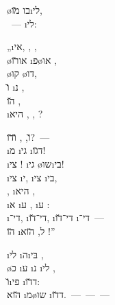\begin{twocol}
\begin{stanza}
 \o{בו}   \u{מו}\i{לי},\\
  ~—   \i{לי}:
\end{stanza}

\begin{stanza}
„\i{אי}, ,   ,\\
 \o{או}\u{רו} \i{פ}\o{או} ,\\
 \o{קו}   \o{דו},\\
\u{ו} \i{נ}  ,\\
 \u{הו}   ,\\
\i{היא} , , ?
\end{stanza}

\begin{stanza}
\u{ו}, ,   \u{ו}\u{דו}?~—\\
\i{מ} \i{גי}   \i{ד}\u{גו}!\\
\i{צי} ! \i{גי} \o{שו}\i{בי}!\\
\i{צי}  \i{י}, \i{צי} \i{בי},\\
  , \i{היא} ,\\
\i{א} \i{ע} ,  \i{ע} :\\
\i{די}־, \i{די}־\u{דו}, \i{די}־\u{דו} \i{די}־~—\\
\u{הו}  \i{ל}, \u{הוא} !”
\end{stanza}

\begin{stanza}
 \i{לי} \i{ה}\i{בּי}  ,\\
\o{כ} \i{ע} \i{נ} \i{לי} ,\\
  \u{ו}\i{פי} \i{ד}\u{דו}:\\
 \u{הוא} \i{מ}\o{שו}  \i{ד}\u{דו}.~—~—~—
\end{stanza}


\end{twocol}
